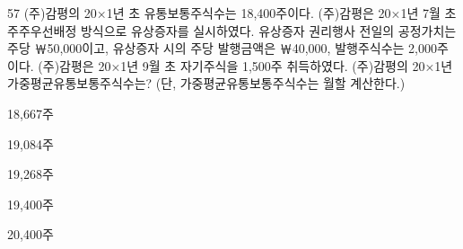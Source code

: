 \begin{question}{57}
(주)감평의 20×1년 초 유통보통주식수는 18,400주이다. (주)감평은 20×1년 7월 초 주주우선배정 방식으로 유상증자를 실시하였다. 유상증자 권리행사 전일의 공정가치는 주당 ￦50,000이고, 유상증자 시의 주당 발행금액은 ￦40,000, 발행주식수는 2,000주이다. (주)감평은 20×1년 9월 초 자기주식을 1,500주 취득하였다. (주)감평의 20×1년 가중평균유통보통주식수는? (단, 가중평균유통보통주식수는 월할 계산한다.)
\begin{choices}
  \item 18,667주
  \item 19,084주
  \item 19,268주
  \item 19,400주
  \item 20,400주
\end{choices}
\end{question}
